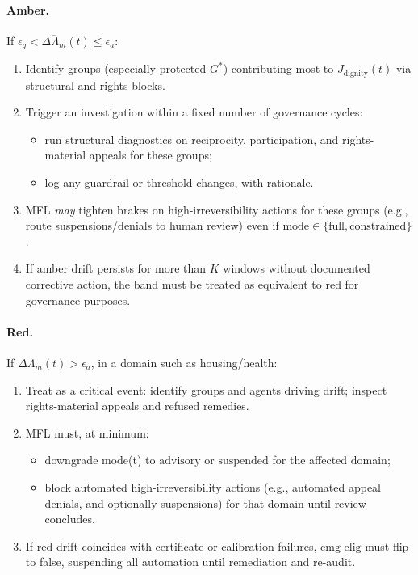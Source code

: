 \documentclass[11pt]{article}
\begin{document}
\paragraph{Amber.}
If \(\epsilon_q < \overline{\Delta \Lambda_m}(t) \le \epsilon_a\):

\begin{enumerate}[leftmargin=*]
  \item Identify groups (especially protected \(G^\ast\)) contributing most to \(J_{\text{dignity}}(t)\) via structural and rights blocks.
  \item Trigger an investigation within a fixed number of governance cycles:
    \begin{itemize}
      \item run structural diagnostics on reciprocity, participation, and rights-material appeals for these groups;
      \item log any guardrail or threshold changes, with rationale.
    \end{itemize}
  \item MFL \emph{may} tighten brakes on high-irreversibility actions for these groups (e.g., route suspensions/denials to human review) even if \(\text{mode} \in \{\text{full},\text{constrained}\}\).
  \item If amber drift persists for more than \(K\) windows without documented corrective action, the band must be treated as equivalent to red for governance purposes.
\end{enumerate}

\paragraph{Red.}
If \(\overline{\Delta \Lambda_m}(t) > \epsilon_a\), in a domain such as housing/health:

\begin{enumerate}[leftmargin=*]
  \item Treat as a critical event: identify groups and agents driving drift; inspect rights-material appeals and refused remedies.
  \item MFL must, at minimum:
    \begin{itemize}
      \item downgrade mode(t) to \(\text{advisory}\) or \(\text{suspended}\) for the affected domain;
      \item block automated high-irreversibility actions (e.g., automated appeal denials, and optionally suspensions) for that domain until review concludes.
    \end{itemize}
  \item If red drift coincides with certificate or calibration failures, \(\text{cmg\_elig}\) must flip to false, suspending all automation until remediation and re-audit.
\end{enumerate}
\end{document}
